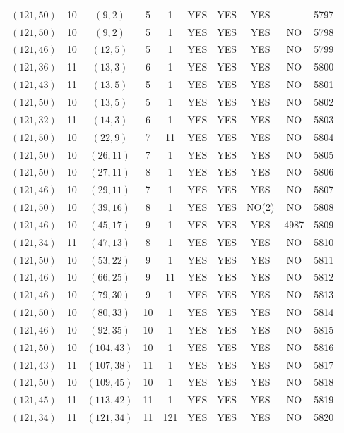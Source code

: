 \begin{longtable}{|c|c|c|c|c|c|c|c|c|c|}
$(121, 50)$ & 10 & $(9, 2)$ & 5 & 1 & YES & YES & YES & -- & 5797\\
$(121, 50)$ & 10 & $(9, 2)$ & 5 & 1 & YES & YES & YES & NO & 5798\\
$(121, 46)$ & 10 & $(12, 5)$ & 5 & 1 & YES & YES & YES & NO & 5799\\
$(121, 36)$ & 11 & $(13, 3)$ & 6 & 1 & YES & YES & YES & NO & 5800\\
$(121, 43)$ & 11 & $(13, 5)$ & 5 & 1 & YES & YES & YES & NO & 5801\\
$(121, 50)$ & 10 & $(13, 5)$ & 5 & 1 & YES & YES & YES & NO & 5802\\
$(121, 32)$ & 11 & $(14, 3)$ & 6 & 1 & YES & YES & YES & NO & 5803\\
$(121, 50)$ & 10 & $(22, 9)$ & 7 & 11 & YES & YES & YES & NO & 5804\\
$(121, 50)$ & 10 & $(26, 11)$ & 7 & 1 & YES & YES & YES & NO & 5805\\
$(121, 50)$ & 10 & $(27, 11)$ & 8 & 1 & YES & YES & YES & NO & 5806\\
$(121, 46)$ & 10 & $(29, 11)$ & 7 & 1 & YES & YES & YES & NO & 5807\\
$(121, 50)$ & 10 & $(39, 16)$ & 8 & 1 & YES & YES & NO(2) & NO & 5808\\
$(121, 46)$ & 10 & $(45, 17)$ & 9 & 1 & YES & YES & YES & 4987 & 5809\\
$(121, 34)$ & 11 & $(47, 13)$ & 8 & 1 & YES & YES & YES & NO & 5810\\
$(121, 50)$ & 10 & $(53, 22)$ & 9 & 1 & YES & YES & YES & NO & 5811\\
$(121, 46)$ & 10 & $(66, 25)$ & 9 & 11 & YES & YES & YES & NO & 5812\\
$(121, 46)$ & 10 & $(79, 30)$ & 9 & 1 & YES & YES & YES & NO & 5813\\
$(121, 50)$ & 10 & $(80, 33)$ & 10 & 1 & YES & YES & YES & NO & 5814\\
$(121, 46)$ & 10 & $(92, 35)$ & 10 & 1 & YES & YES & YES & NO & 5815\\
$(121, 50)$ & 10 & $(104, 43)$ & 10 & 1 & YES & YES & YES & NO & 5816\\
$(121, 43)$ & 11 & $(107, 38)$ & 11 & 1 & YES & YES & YES & NO & 5817\\
$(121, 50)$ & 10 & $(109, 45)$ & 10 & 1 & YES & YES & YES & NO & 5818\\
$(121, 45)$ & 11 & $(113, 42)$ & 11 & 1 & YES & YES & YES & NO & 5819\\
$(121, 34)$ & 11 & $(121, 34)$ & 11 & 121 & YES & YES & YES & NO & 5820\\

\end{longtable}
